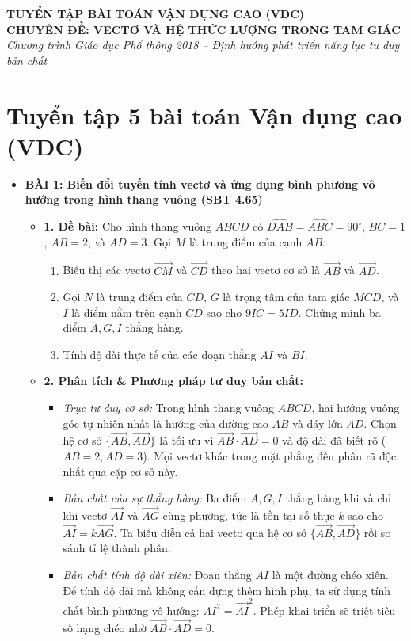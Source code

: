 \documentclass[12pt,a4paper]{article}
\begin{document}
\begin{center}
    {\Large \textbf{TUYỂN TẬP BÀI TOÁN VẬN DỤNG CAO (VDC)}}\\[2mm]
    {\large \textbf{CHUYÊN ĐỀ: VECTƠ VÀ HỆ THỨC LƯỢNG TRONG TAM GIÁC}}\\[1mm]
    {\normalsize \textit{Chương trình Giáo dục Phổ thông 2018 -- Định hướng phát triển năng lực tư duy bản chất}}
\end{center}

\vspace{5mm}

\section{Tuyển tập 5 bài toán Vận dụng cao (VDC)}

\begin{itemize}
    \item \textbf{BÀI 1: Biến đổi tuyến tính vectơ và ứng dụng bình phương vô hướng trong hình thang vuông (SBT 4.65)}
    \begin{itemize}
        \item \textbf{1. Đề bài:}
        Cho hình thang vuông $ABCD$ có $\widehat{DAB} = \widehat{ABC} = 90^\circ$, $BC = 1$, $AB = 2$, và $AD = 3$. Gọi $M$ là trung điểm của cạnh $AB$.
        \begin{enumerate}
            \item Biểu thị các vectơ $\vec{CM}$ và $\vec{CD}$ theo hai vectơ cơ sở là $\vec{AB}$ và $\vec{AD}$.
            \item Gọi $N$ là trung điểm của $CD$, $G$ là trọng tâm của tam giác $MCD$, và $I$ là điểm nằm trên cạnh $CD$ sao cho $9IC = 5ID$. Chứng minh ba điểm $A, G, I$ thẳng hàng.
            \item Tính độ dài thực tế của các đoạn thẳng $AI$ và $BI$.
        \end{enumerate}

        \item \textbf{2. Phân tích \& Phương pháp tư duy bản chất:}
        \begin{itemize}
            \item \textit{Trục tư duy cơ sở:} Trong hình thang vuông $ABCD$, hai hướng vuông góc tự nhiên nhất là hướng của đường cao $AB$ và đáy lớn $AD$. Chọn hệ cơ sở $\{\vec{AB}, \vec{AD}\}$ là tối ưu vì $\vec{AB} \cdot \vec{AD} = 0$ và độ dài đã biết rõ ($AB = 2, AD = 3$). Mọi vectơ khác trong mặt phẳng đều phân rã độc nhất qua cặp cơ sở này.
            \item \textit{Bản chất của sự thẳng hàng:} Ba điểm $A, G, I$ thẳng hàng khi và chỉ khi vectơ $\vec{AI}$ và $\vec{AG}$ cùng phương, tức là tồn tại số thực $k$ sao cho $\vec{AI} = k \vec{AG}$. Ta biểu diễn cả hai vectơ qua hệ cơ sở $\{\vec{AB}, \vec{AD}\}$ rồi so sánh tỉ lệ thành phần.
            \item \textit{Bản chất tính độ dài xiên:} Đoạn thẳng $AI$ là một đường chéo xiên. Để tính độ dài mà không cần dựng thêm hình phụ, ta sử dụng tính chất bình phương vô hướng: $AI^2 = \vec{AI}^2$. Phép khai triển sẽ triệt tiêu số hạng chéo nhờ $\vec{AB} \cdot \vec{AD} = 0$.
        \end{itemize}


\end{itemize}
\end{itemize}
\end{document}
